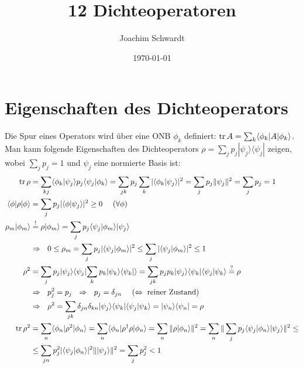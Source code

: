 \documentclass[a4paper,12pt]{article}
\newcommand{\brak}{}
\newcommand{\braket}{}
\newcommand{\oper}{}
\newcommand{\tecxt}{}
\newcommand{\Ket}{}
\begin{document}
\title{12 Dichteoperatoren}
\author{Joachim Schwardt}
\date{\today}
\maketitle

\section{Eigenschaften des Dichteoperators}
Die Spur eines Operators wird über eine ONB $\phi_k$ definiert: $\tecxt\text{tr\,}A=\sum_k\braket\langle {\phi_k} | {A} | {\phi_k}\rangle$.\\ Man kann folgende Eigenschaften des Dichteoperators $\rho=\sum_jp_j\oper | {\psi_j} \rangle\langle {\psi_j} |$ zeigen, wobei $\sum_jp_j=1$ und $\psi_j$ eine normierte Basis ist:
\begin{align*}
\tecxt\text{tr\,}\rho&=\sum_{kj}\brak\langle {\phi_k}| {\psi_j}\rangle p_j\brak\langle {\psi_j}| {\phi_k}\rangle=\sum_{jk}p_j\sum_k|\brak\langle {\phi_k}| {\psi_j}\rangle|^2=\sum_jp_j\|\psi_j\|^2=\sum_jp_j=1\\
\braket\langle {\phi} | {\rho} | {\phi}\rangle&=\sum_jp_j|\brak\langle {\phi}| {\psi_j}\rangle|^2\ge 0\ \ \ \ (\forall\phi)\\
\rho_m\Ket | {\phi_m} \rangle&\overset{!}{=}\rho\Ket | {\phi_m} \rangle=\sum_jp_j\brak\langle {\psi_j}| {\phi_m}\rangle\Ket | {\psi_j} \rangle\\ 
&\Rightarrow\ \ 0\le \rho_m=\sum_jp_j|\brak\langle {\psi_j}| {\phi_m}\rangle|^2\le\sum_j|\brak\langle {\psi_j}| {\phi_m}\rangle|^2\le 1\\
\rho^2&=\sum_jp_j\Ket | {\psi_j} \rangle\brak\langle {\psi_j}| {\sum_kp_k\oper | {\psi_k} \rangle\langle {\psi_k} |}\rangle=\sum_{jk}p_jp_k\oper | {\psi_j} \rangle\langle {\psi_k} |\brak\langle {\psi_j}| {\psi_k}\rangle\overset{?}{=}\rho\\
&\Rightarrow\ \ p_j^2=p_j\ \ \Rightarrow\ \ p_j=\delta_{jn}\ \ \ \ (\Leftrightarrow\ \tecxt\text{reiner Zustand})\\ 
&\Rightarrow\ \ \rho^2=\sum_{jk}\delta_{jn}\delta_{kn}\oper | {\psi_j} \rangle\langle {\psi_k} |\brak\langle {\psi_j}| {\psi_k}\rangle=\oper | {\psi_n} \rangle\langle {\psi_n} |=\rho\\
\tecxt\text{tr\,}\rho^2&=\sum_n\braket\langle {\phi_n} | {\rho^2} | {\phi_n}\rangle=\sum_n\braket\langle {\phi_n} | {\rho^\dagger\rho} | {\phi_n}\rangle=\sum_n\|\rho\Ket | {\phi_n} \rangle\|^2=\sum_{n}\|\sum_jp_j\brak\langle {\psi_j}| {\phi_n}\rangle\Ket | {\psi_j} \rangle\|^2\le\\
&\le\sum_{jn}p_j^2|\brak\langle {\psi_j}| {\phi_n}\rangle|^2\|\Ket | {\psi_j} \rangle\|^2=\sum_jp_j^2<1
\end{align*}
\end{document}
